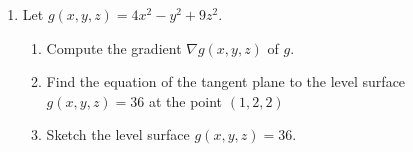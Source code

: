 \documentclass[12pt]{article}
\begin{document}
\begin{enumerate}
\begin{enumerate}
\vspace{2.5in}
\end{enumerate}
\item Let $g(x,y,z) = 4x^2-y^2+9z^2$.
\begin{enumerate}
 \item Compute the gradient $\nabla g(x,y,z)$ of $g$.\marginpar{[3]}

\vspace{1in}

 \item Find the equation of the tangent plane to the level surface $g(x,y,z)=36$ at the point $(1,2,2)$ \marginpar{[4]}

\vspace{1.5in}

 \item Sketch the level surface $g(x,y,z)=36$. \marginpar{[3]}
\end{enumerate}


\end{enumerate}
\end{document}
